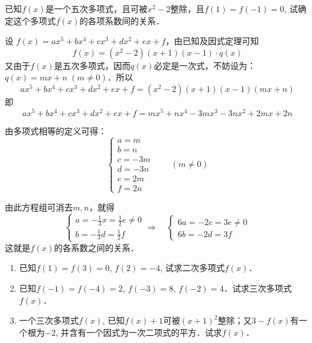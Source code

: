 \begin{example}
已知$f(x)$是一个五次多项式，且可被$x^2-2$整除，且$f(1)=f(-1)=0$, 试确定这个多项式$f(x)$的各项系数间的关系．
\end{example}

\begin{solution}
设 $f(x)=ax^5+bx^4+cx^3+dx^2+ex+f$，由已知及因式定理可知
\[f (x) = (x^2-2) (x+1)(x-1)\cdot q(x)\]
又由于$f(x)$是五次多项式，因而$q(x)$必定是一次式，不妨设为：$q(x)=mx+n\; (m\ne 0)$．所以
\[ax^5+bx^4+cx^3+dx^2+ex+f= (x^2-2) (x+1)(x-1)(mx+n)\] 
即
\[ax^5+bx^4+cx^3+dx^2+ex+f= mx^5+nx^4-3mx^3-3nx^2+2mx+2n\] 

由多项式相等的定义可得：
\[\begin{cases}
    a=m\\
    b=n\\
    c=-3m\\
    d=-3n\\
    e=2m\\
    f=2n
\end{cases}\qquad (m\ne 0)\]

由此方程组可消去$m,n$，就得
\[\begin{cases}
    a=-\frac{1}{3}x=\frac{1}{2}e\ne 0\\
    b=-\frac{1}{3}d=\frac{1}{2}f
\end{cases}\Rightarrow\quad \begin{cases}
    6a=-2c=3e\ne 0\\
    6b=-2d=3f
\end{cases}\]
这就是$f(x)$的各系数之间的关系．
\end{solution}

\begin{ex}
\begin{enumerate}
    \item 已知$f(1)=f(3)=0$, $f(2)=-4$, 试求二次多项式$f (x)$．
    \item 已知$f(-1)=f(-4)=2$, $f(-3)=8$, $f(-2)=4$．试求三次多项式$f(x)$．
    \item 一个三次多项式$f(x)$, 已知$f(x)+1$可被$(x+1)^2$整除；又$3-f(x)$有一个根为$-2$, 并含有一个因式为一次二项式的平方．试求$f(x)$．
\end{enumerate}
\end{ex}


